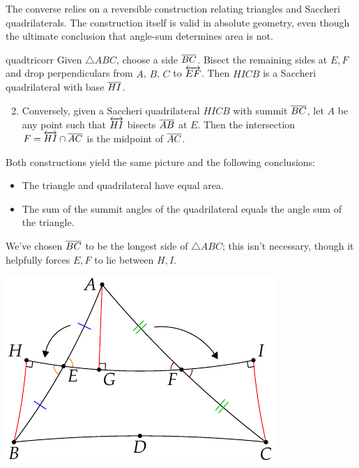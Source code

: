 \goodbreak



The converse relies on a reversible construction relating triangles and Saccheri quadrilaterals. The construction itself is valid in absolute geometry, even though the ultimate conclusion that angle-sum determines area is not.

\begin{lemm}{}{quadtricorr}
\exstart Given $\triangle ABC$, choose a side $\overline{BC}$. Bisect the remaining sides at $E,F$ and drop perpendiculars from $A$, $B$, $C$ to $\overleftrightarrow{EF}$. Then $HICB$ is a Saccheri quadrilateral with base $\overline{HI}$.\vspace{-5pt}
\begin{enumerate}\setcounter{enumi}{1}
  \item Conversely, given a Saccheri quadrilateral $HICB$ with summit $\overline{BC}$, let $A$ be any point such that $\overleftrightarrow{HI}$ bisects $\overline{AB}$ at $E$. Then the intersection $F=\overleftrightarrow{HI}\cap\overline{AC}$ is the midpoint of $\overline{AC}$.
\end{enumerate}
\begin{minipage}[t]{0.6\linewidth}\vspace{-5pt}
Both constructions yield the same picture and the following conclusions:\vspace{-5pt}
  \begin{itemize}
    \item The triangle and quadrilateral have equal area.
    \item The sum of the summit angles of the quadrilateral equals the angle sum of the triangle.
  \end{itemize}
  We've chosen $\overline{BC}$ to be the longest side of $\triangle ABC$; this isn't necessary, though it helpfully forces $E,F$ to lie between $H,I$.
\end{minipage}\hfill\begin{minipage}[t]{0.39\linewidth}\vspace{-15pt}
\flushright\includegraphics{area-saccheri4}
\end{minipage}
\end{lemm}


